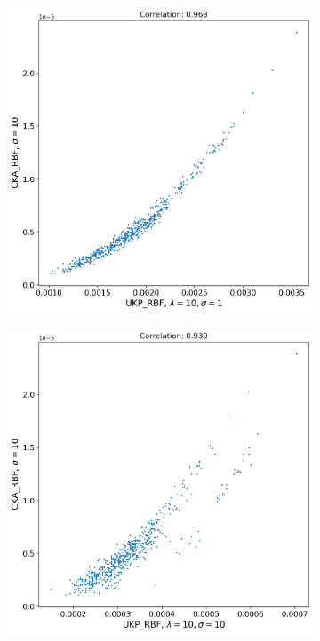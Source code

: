 \documentclass[11pt]{article}
\theoremstyle{plain}
\begin{document}
\begin{figure}[h!]
    \vspace{0.5cm}  %
    
    \begin{subfigure}[b]{0.45\textwidth}
        \includegraphics[width=\textwidth]{Appendix figures/imagenet_experiments/Correlation final/Correlation plot for CKA_dist_RBF_1.000000e+01 and UKP_dist_RBF_1.000000e+01_1.000000e+00.png}
    \end{subfigure}
    \hfill
    \begin{subfigure}[b]{0.45\textwidth}
        \includegraphics[width=\textwidth]{Appendix figures/imagenet_experiments/Correlation final/Correlation plot for CKA_dist_RBF_1.000000e+01 and UKP_dist_RBF_1.000000e+01_1.000000e+01.png}
    \end{subfigure}
    

\end{figure}
\end{document}
